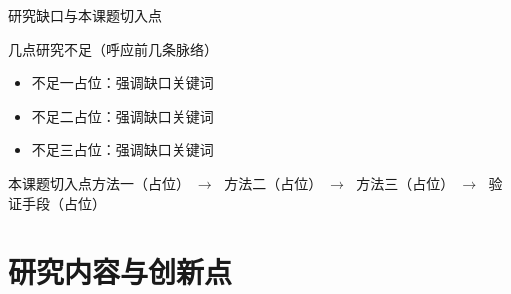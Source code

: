 \documentclass[aspectratio=169,11pt]{beamer}
\begin{document}
\begin{frame}{研究缺口与本课题切入点}
  \small
  \vspace*{-2.5mm}
  \begin{dmupoint}{几点研究不足（呼应前几条脉络）}
    \begin{itemize}
      \item[Ⅰ] 不足一占位：\textcolor{dmuaccent}{强调缺口关键词}
      \item[Ⅱ] 不足二占位：\textcolor{dmuaccent}{强调缺口关键词}
      \item[Ⅲ] 不足三占位：\textcolor{dmuaccent}{强调缺口关键词}
    \end{itemize}
  \end{dmupoint}
  \vskip-1.2mm
  \begin{dmuband}
    {\footnotesize\color{dmuaccent}本课题切入点}\quad 方法一（占位）$\;\to\;$ 方法二（占位）$\;\to\;$ 方法三（占位）$\;\to\;$ 验证手段（占位）
  \end{dmuband}
\end{frame}

\section{研究内容与创新点}
\end{document}
